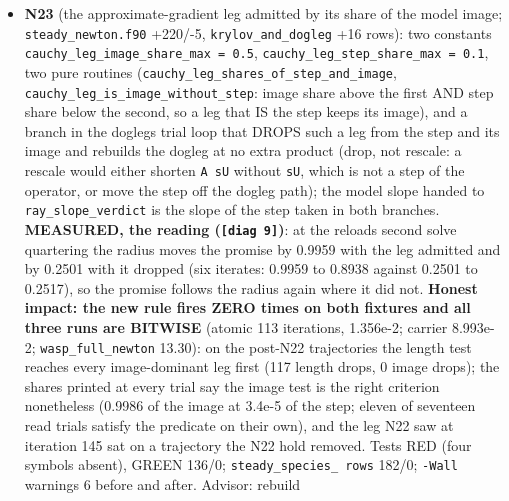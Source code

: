 \documentclass[english,a4paper]{my_memo}
\begin{document}
\begin{itemize}
  evaluated by the entry and the N10b binary is bitwise, so not N10b\textquotesingle s);
  the advisor pinned the certified state as
  \texttt{backup/regression/wasp\_full\_newton/IC/} (copied from the golden,
  \texttt{certified=T}, README there) and pointed the row at it. Reported:
  \texttt{restart\_grid\_guard.sh}\textquotesingle s stale header (third time); \texttt{sec\_ion\_step=0} on a
  re-evaluated state; whether \texttt{molbase}, \texttt{he\_diff}, \texttt{he\_metal\_diff} belong
  with the layout tokens is a reviewer\textquotesingle s question (the worker\textquotesingle s reading:
  they add operators, not rows).
\item
  \textbf{N23} (the approximate-gradient leg admitted by its share of the model
  image; \texttt{steady\_newton.f90} +220/-5, \texttt{krylov\_and\_dogleg} +16 rows): two
  constants \texttt{cauchy\_leg\_image\_share\_max\ =\ 0.5}, \texttt{cauchy\_leg\_step\_share\_max\ =\ 0.1}, two pure routines (\texttt{cauchy\_leg\_shares\_of\_step\_and\_image},
  \texttt{cauchy\_leg\_is\_image\_without\_step}: image share above the first AND step
  share below the second, so a leg that IS the step keeps its image), and a
  branch in the dogleg\textquotesingle s trial loop that DROPS such a leg from the step and
  its image and rebuilds the dogleg at no extra product (drop, not rescale:
  a rescale would either shorten \texttt{A\ sU} without \texttt{sU}, which is not a step of
  the operator, or move the step off the dogleg path); the model slope
  handed to \texttt{ray\_slope\_verdict} is the slope of the step taken in both
  branches. \textbf{MEASURED, the reading (\texttt{{[}diag\ 9{]}})}: at the reload\textquotesingle s second
  solve quartering the radius moves the promise by 0.9959 with the leg
  admitted and by 0.2501 with it dropped (six iterates: 0.9959 to 0.8938
  against 0.2501 to 0.2517), so the promise follows the radius again where it
  did not. \textbf{Honest impact: the new rule fires ZERO times on both fixtures
  and all three runs are BITWISE} (atomic 113 iterations, 1.356e-2;
  carrier 8.993e-2; \texttt{wasp\_full\_newton} 13.30): on the post-N22 trajectories
  the length test reaches every image-dominant leg first (117 length drops,
  0 image drops); the shares printed at every trial say the image test is
  the right criterion nonetheless (0.9986 of the image at 3.4e-5 of the
  step; eleven of seventeen read trials satisfy the predicate on their own),
  and the leg N22 saw at iteration 145 sat on a trajectory the N22 hold
  removed. Tests RED (four symbols absent), GREEN 136/0; \texttt{steady\_species\_\ rows} 182/0; \texttt{-Wall} warnings 6 before and after. Advisor: rebuild

\end{itemize}
\end{document}
